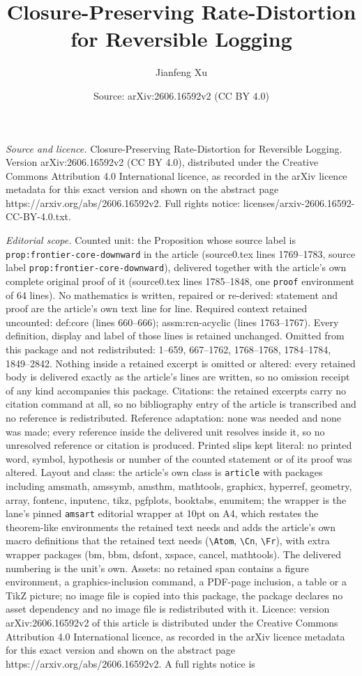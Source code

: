 \documentclass[10pt,a4paper]{amsart}
\title[Closure-Preserving Rate-Distortion for Reversible Logging]{Closure-Preserving Rate-Distortion for Reversible Logging}
\author{Jianfeng Xu}
\date{Source: arXiv:2606.16592v2 (CC BY 4.0)}
\begin{document}
\maketitle

\noindent\emph{Source and licence.} Closure-Preserving Rate-Distortion for Reversible Logging. Version arXiv:2606.16592v2 (CC BY 4.0), distributed under the Creative Commons Attribution 4.0 International licence, as recorded in the arXiv licence metadata for this exact version and shown on the abstract page https://arxiv.org/abs/2606.16592v2. Full rights notice: licenses/arxiv-2606.16592-CC-BY-4.0.txt.\par\smallskip

\noindent\textit{Editorial scope.} Counted unit: the Proposition whose source label is \texttt{prop:frontier-core-downward} in the article (source0.tex lines 1769--1783, source label \texttt{prop:frontier-core-downward}), delivered together with the article's own complete original proof of it (source0.tex lines 1785--1848, one \texttt{proof} environment of 64 lines). No mathematics is written, repaired or re-derived: statement and proof are the article's own text line for line. Required context retained uncounted: def:core (lines 660--666); assm:rcn-acyclic (lines 1763--1767). Every definition, display and label of those lines is retained unchanged. Omitted from this package and not redistributed: 1--659, 667--1762, 1768--1768, 1784--1784, 1849--2842. Nothing inside a retained excerpt is omitted or altered: every retained body is delivered exactly as the article's lines are written, so no omission receipt of any kind accompanies this package. Citations: the retained excerpts carry no citation command at all, so no bibliography entry of the article is transcribed and no reference is redistributed. Reference adaptation: none was needed and none was made; every reference inside the delivered unit resolves inside it, so no unresolved reference or citation is produced. Printed slips kept literal: no printed word, symbol, hypothesis or number of the counted statement or of its proof was altered. Layout and class: the article's own class is \texttt{article} with packages including amsmath, amssymb, amsthm, mathtools, graphicx, hyperref, geometry, array, fontenc, inputenc, tikz, pgfplots, booktabs, enumitem; the wrapper is the lane's pinned \texttt{amsart} editorial wrapper at 10pt on A4, which restates the theorem-like environments the retained text needs and adds the article's own macro definitions that the retained text needs (\texttt{\textbackslash Atom}, \texttt{\textbackslash Cn}, \texttt{\textbackslash Fr}), with extra wrapper packages (bm, bbm, dsfont, xspace, cancel, mathtools). The delivered numbering is the unit's own. Assets: no retained span contains a figure environment, a graphics-inclusion command, a PDF-page inclusion, a table or a TikZ picture; no image file is copied into this package, the package declares no asset dependency and no image file is redistributed with it. Licence: version arXiv:2606.16592v2 of this article is distributed under the Creative Commons Attribution 4.0 International licence, as recorded in the arXiv licence metadata for this exact version and shown on the abstract page https://arxiv.org/abs/2606.16592v2. A full rights notice is 
\end{document}
